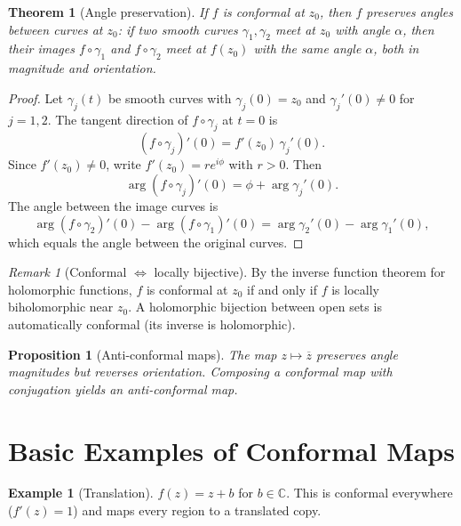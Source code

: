 \documentclass[12pt,a4paper,openany]{book}
\theoremstyle{definition}
\newtheorem{example}[definition]{Example}
\theoremstyle{plain}
\newtheorem{theorem}[definition]{Theorem}
\newtheorem{proposition}[definition]{Proposition}
\theoremstyle{remark}
\newtheorem{remark}[definition]{Remark}
\newcommand{\C}{\mathbb{C}}
\newcommand{\conj}[1]{\overline{#1}}
\begin{document}
\begin{theorem}[Angle preservation]\label{thm:angle-preservation}
If $f$ is conformal at $z_0$, then $f$ preserves angles between curves
at $z_0$: if two smooth curves $\gamma_1,\gamma_2$ meet at $z_0$ with
angle $\alpha$, then their images $f\circ\gamma_1$ and $f\circ\gamma_2$
meet at $f(z_0)$ with the same angle $\alpha$, both in magnitude and
orientation.
\end{theorem}

\begin{proof}
Let $\gamma_j(t)$ be smooth curves with $\gamma_j(0)=z_0$ and
$\gamma_j'(0)\neq 0$ for $j=1,2$.  The tangent direction of
$f\circ\gamma_j$ at $t=0$ is
\[
  (f\circ\gamma_j)'(0)=f'(z_0)\,\gamma_j'(0).
\]
Since $f'(z_0)\neq 0$, write $f'(z_0)=re^{i\phi}$ with $r>0$.
Then
\[
  \arg(f\circ\gamma_j)'(0)=\phi+\arg\gamma_j'(0).
\]
The angle between the image curves is
\[
  \arg(f\circ\gamma_2)'(0)-\arg(f\circ\gamma_1)'(0)
  =\arg\gamma_2'(0)-\arg\gamma_1'(0),
\]
which equals the angle between the original curves.
\end{proof}

\begin{remark}[Conformal $\Leftrightarrow$ locally bijective]\label{rem:conf-local-bij}
By the inverse function theorem for holomorphic functions, $f$ is
conformal at $z_0$ if and only if $f$ is locally biholomorphic near
$z_0$.  A holomorphic bijection between open sets is automatically
conformal (its inverse is holomorphic).
\end{remark}

\begin{proposition}[Anti-conformal maps]\label{prop:anti-conformal}
The map $z\mapsto\conj{z}$ preserves angle magnitudes but reverses
orientation.  Composing a conformal map with conjugation yields an
\emph{anti-conformal} map.
\end{proposition}

\section{Basic Examples of Conformal Maps}\label{sec:basic-conformal}

\begin{example}[Translation]\label{ex:translation}
$f(z)=z+b$ for $b\in\C$.  This is conformal everywhere ($f'(z)=1$) and
maps every region to a translated copy.
\end{example}
\end{document}
